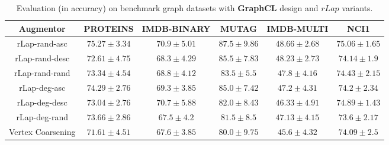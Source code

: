 \documentclass{article}
\theoremstyle{plain}
\theoremstyle{definition}
\theoremstyle{remark}
\begin{document}
\begin{table*}[ht!]
\centering
\caption{Evaluation (in accuracy) on benchmark graph datasets with \textbf{GraphCL} design and $rLap$ variants.}
\label{table:rlap_ablation_graphcl}
\vskip 0.15in
\begin{center}
\begin{small}
\begin{sc}
\begin{tabular}{c|c|c|c|c|c}
\toprule
Augmentor & PROTEINS & IMDB-BINARY & MUTAG & IMDB-MULTI & NCI1\\
\midrule
rLap-rand-asc & $\mathbf{75.27 \pm 3.34}$ & $\mathbf{70.9 \pm 5.01}$  & $\mathbf{87.5 \pm 9.86}$  & $\mathbf{48.66 \pm 2.68}$ & $\mathbf{75.06 \pm 1.65}$  \\
rLap-rand-desc & $72.61 \pm 4.75$ & $68.3 \pm 4.29$ & \underline{$85.5 \pm 7.83$} & \underline{$48.23 \pm 2.73$} & $74.14 \pm 1.9$ \\
rLap-rand-rand & $73.34 \pm 4.54$ & $68.8 \pm 4.12$ & $83.5 \pm 5.5$ & $47.8 \pm 4.16$ & $74.43 \pm 2.15$\\
rLap-deg-asc & \underline{$74.29 \pm 2.76$} & $69.3 \pm 3.85$  & $85.0 \pm 7.42$ & $47.2 \pm 4.31$ & $74.2 \pm 2.34$  \\
rLap-deg-desc & $73.04 \pm 2.76$ & \underline{$70.7 \pm 5.88$} & $82.0 \pm 8.43$  & $46.33 \pm 4.91$ & \underline{$74.89 \pm 1.43$}  \\
rLap-deg-rand & $73.66 \pm 2.86$ & $67.5 \pm 4.2$ & $81.5 \pm 8.5$ & $47.13 \pm 4.15$ & $73.6 \pm 2.17$ \\
Vertex Coarsening & $71.61 \pm 4.51$ & $67.6 \pm 3.85$  & $80.0 \pm 9.75$ & $45.6 \pm 4.32$ & $74.09 \pm 2.5$\\
\bottomrule
\end{tabular}
\end{sc}
\end{small}
\end{center}
\vskip -0.1in
\end{table*}
\end{document}
